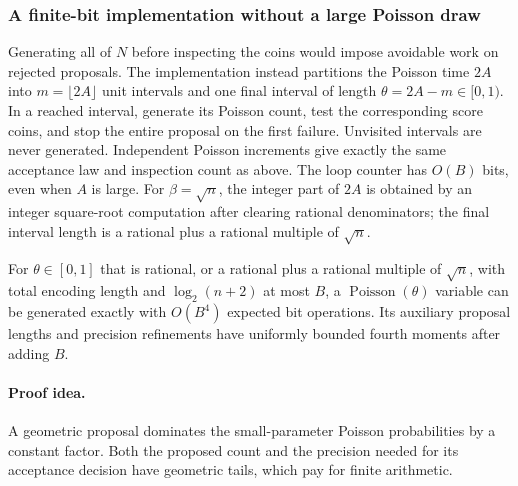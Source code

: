 \subsubsection{A finite-bit implementation without a large Poisson draw}

Generating all of $N$ before inspecting the coins would impose avoidable
work on rejected proposals.  The implementation instead partitions the
Poisson time $2A$ into $m=\lfloor2A\rfloor$ unit intervals and one final
interval of length $\theta=2A-m\in[0,1)$.  In a reached interval, generate
its Poisson count, test the corresponding score coins, and stop the entire
proposal on the first failure.  Unvisited intervals are never generated.
Independent Poisson increments give exactly the same acceptance law and
inspection count as above. The loop counter has $O(B)$ bits, even when
$A$ is large. For $\beta=\sqrt n$, the integer part of $2A$ is
obtained by an integer square-root computation after clearing rational
denominators; the final interval length is a rational plus a rational
multiple of $\sqrt n$.

\begin{lemma}\label{lem:smallpoissonattention}
For $\theta\in[0,1]$ that is rational, or a rational plus a rational
multiple of $\sqrt n$, with total encoding length and $\log_2(n+2)$
at most $B$, a
$\operatorname{Poisson}(\theta)$ variable can be generated exactly with
$O(B^4)$ expected bit operations.  Its auxiliary proposal lengths and
precision refinements have uniformly bounded fourth moments after adding
$B$.
\end{lemma}
\paragraph{Proof idea.}
A geometric proposal dominates the small-parameter Poisson probabilities by a constant factor.  Both the proposed count and the precision needed for its acceptance decision have geometric tails, which pay for finite arithmetic.

